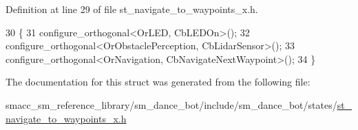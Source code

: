 Definition at line 29 of file st\+\_\+navigate\+\_\+to\+\_\+waypoints\+\_\+x.\+h.


\begin{DoxyCode}
30   \{
31     configure\_orthogonal<OrLED, CbLEDOn>();
32     configure\_orthogonal<OrObstaclePerception, CbLidarSensor>();
33     configure\_orthogonal<OrNavigation, CbNavigateNextWaypoint>();
34   \}
\end{DoxyCode}


The documentation for this struct was generated from the following file\+:\begin{DoxyCompactItemize}
\item 
smacc\+\_\+sm\+\_\+reference\+\_\+library/sm\+\_\+dance\+\_\+bot/include/sm\+\_\+dance\+\_\+bot/states/\hyperlink{sm__dance__bot_2include_2sm__dance__bot_2states_2st__navigate__to__waypoints__x_8h}{st\+\_\+navigate\+\_\+to\+\_\+waypoints\+\_\+x.\+h}\end{DoxyCompactItemize}
